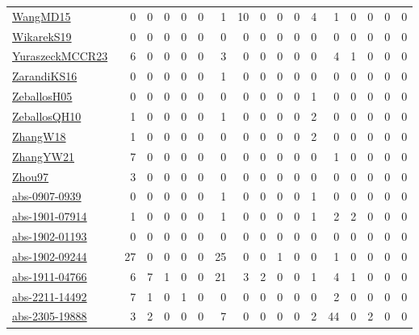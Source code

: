 {\begin{longtable}{l*{16}{r}}
\href{articles/WangMD15.pdf}{WangMD15}~\cite{WangMD15} & 0 & 0 & 0 & 0 & 0 & 1 & 10 & 0 & 0 & 0 & 4 & 1 & 0 & 0 & 0 & 0\\
\href{articles/WikarekS19.pdf}{WikarekS19}~\cite{WikarekS19} & 0 & 0 & 0 & 0 & 0 & 0 & 0 & 0 & 0 & 0 & 0 & 0 & 0 & 0 & 0 & 0\\
\href{articles/YuraszeckMCCR23.pdf}{YuraszeckMCCR23}~\cite{YuraszeckMCCR23} & 6 & 0 & 0 & 0 & 0 & 3 & 0 & 0 & 0 & 0 & 0 & 4 & 1 & 0 & 0 & 0\\
\href{articles/ZarandiKS16.pdf}{ZarandiKS16}~\cite{ZarandiKS16} & 0 & 0 & 0 & 0 & 0 & 1 & 0 & 0 & 0 & 0 & 0 & 0 & 0 & 0 & 0 & 0\\
\href{articles/ZeballosH05.pdf}{ZeballosH05}~\cite{ZeballosH05} & 0 & 0 & 0 & 0 & 0 & 0 & 0 & 0 & 0 & 0 & 1 & 0 & 0 & 0 & 0 & 0\\
\href{articles/ZeballosQH10.pdf}{ZeballosQH10}~\cite{ZeballosQH10} & 1 & 0 & 0 & 0 & 0 & 1 & 0 & 0 & 0 & 0 & 2 & 0 & 0 & 0 & 0 & 0\\
\href{articles/ZhangW18.pdf}{ZhangW18}~\cite{ZhangW18} & 1 & 0 & 0 & 0 & 0 & 0 & 0 & 0 & 0 & 0 & 2 & 0 & 0 & 0 & 0 & 0\\
\href{articles/ZhangYW21.pdf}{ZhangYW21}~\cite{ZhangYW21} & 7 & 0 & 0 & 0 & 0 & 0 & 0 & 0 & 0 & 0 & 0 & 1 & 0 & 0 & 0 & 0\\
\href{articles/Zhou97.pdf}{Zhou97}~\cite{Zhou97} & 3 & 0 & 0 & 0 & 0 & 0 & 0 & 0 & 0 & 0 & 0 & 0 & 0 & 0 & 0 & 0\\
\href{articles/abs-0907-0939.pdf}{abs-0907-0939}~\cite{abs-0907-0939} & 0 & 0 & 0 & 0 & 0 & 1 & 0 & 0 & 0 & 0 & 1 & 0 & 0 & 0 & 0 & 0\\
\href{articles/abs-1901-07914.pdf}{abs-1901-07914}~\cite{abs-1901-07914} & 1 & 0 & 0 & 0 & 0 & 1 & 0 & 0 & 0 & 0 & 1 & 2 & 2 & 0 & 0 & 0\\
\href{articles/abs-1902-01193.pdf}{abs-1902-01193}~\cite{abs-1902-01193} & 0 & 0 & 0 & 0 & 0 & 0 & 0 & 0 & 0 & 0 & 0 & 0 & 0 & 0 & 0 & 0\\
\href{articles/abs-1902-09244.pdf}{abs-1902-09244}~\cite{abs-1902-09244} & 27 & 0 & 0 & 0 & 0 & 25 & 0 & 0 & 1 & 0 & 0 & 1 & 0 & 0 & 0 & 0\\
\href{articles/abs-1911-04766.pdf}{abs-1911-04766}~\cite{abs-1911-04766} & 6 & 7 & 1 & 0 & 0 & 21 & 3 & 2 & 0 & 0 & 1 & 4 & 1 & 0 & 0 & 0\\
\href{articles/abs-2211-14492.pdf}{abs-2211-14492}~\cite{abs-2211-14492} & 7 & 1 & 0 & 1 & 0 & 0 & 0 & 0 & 0 & 0 & 0 & 2 & 0 & 0 & 0 & 0\\
\href{articles/abs-2305-19888.pdf}{abs-2305-19888}~\cite{abs-2305-19888} & 3 & 2 & 0 & 0 & 0 & 7 & 0 & 0 & 0 & 0 & 2 & 44 & 0 & 2 & 0 & 0\\

\end{longtable}}
